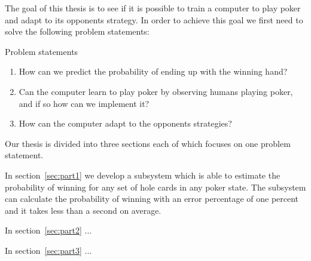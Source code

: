 The goal of this thesis is to see if it is possible to train a computer to play poker and adapt to its opponents strategy. In order to achieve this goal we first need to solve the following problem statements:


\vspace{4mm}
\begin{statementBox2}{Problem statements}
\begin{enumerate}
    \item \label{itm:q1} How can we predict the probability of ending up with the winning hand? 
    \item \label{itm:q2} Can the computer learn to play poker by observing humans playing poker, and if so how can we implement it? 
    \item \label{itm:q3} How can the computer adapt to the opponents strategies?
  \end{enumerate}
\end{statementBox2}
\vspace{4mm}

Our thesis is divided into three sections each of which focuses on one problem statement.

In section~\ref{sec:part1} we develop a subsystem which is able to estimate the probability of winning for any set of hole cards in any poker state. The subsystem can calculate the probability of winning with an error percentage of one percent and it takes less than a second on average.

In section~\ref{sec:part2} ...

In section~\ref{sec:part3} ...
